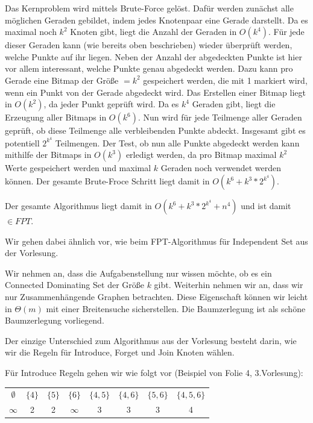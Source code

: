 Das Kernproblem wird mittels Brute-Force gelöst. Dafür werden zunächst alle möglichen Geraden gebildet, indem jedes Knotenpaar eine Gerade darstellt. Da es maximal noch $k^2$ Knoten gibt, liegt die Anzahl der Geraden in $O(k^4)$. Für jede dieser Geraden kann (wie bereits oben beschrieben) wieder überprüft werden, welche Punkte auf ihr liegen. Neben der Anzahl der abgedeckten Punkte ist hier vor allem interessant, welche Punkte genau abgedeckt werden. Dazu kann pro Gerade eine Bitmap der Größe $=k^2$ gespeichert werden, die mit 1 markiert wird, wenn ein Punkt von der Gerade abgedeckt wird. Das Erstellen einer Bitmap liegt in $O(k^2)$, da jeder Punkt geprüft wird. Da es $k^4$ Geraden gibt, liegt die Erzeugung aller Bitmaps in $O(k^6)$. Nun wird für jede Teilmenge aller Geraden geprüft, ob diese Teilmenge alle verbleibenden Punkte abdeckt. Insgesamt gibt es potentiell $2^{k^4}$ Teilmengen. Der Test, ob nun alle Punkte abgedeckt werden kann mithilfe der Bitmaps in $O(k^3)$ erledigt werden, da pro Bitmap maximal $k^2$ Werte gespeichert werden und maximal $k$ Geraden noch verwendet werden können. Der gesamte Brute-Froce Schritt liegt damit in $O(k^6+k^3*2^{k^4})$.

Der gesamte Algorithmus liegt damit in $O(k^6+k^3*2^{k^4}+n^4)$ und ist damit $\in FPT$.


Wir gehen dabei ähnlich vor, wie beim FPT-Algorithmus für Independent Set aus der Vorlesung.

Wir nehmen an, dass die Aufgabenstellung nur wissen möchte, ob es ein Connected Dominating Set der Größe $k$ gibt. Weiterhin nehmen wir an, dass wir nur Zusammenhängende Graphen betrachten.
Diese Eigenschaft können wir leicht in $\Theta(m)$ mit einer Breitensuche sicherstellen.
Die Baumzerlegung ist als schöne Baumzerlegung vorliegend.

Der einzige Unterschied zum Algorithmus aus der Vorlesung besteht darin, wie wir die Regeln für Introduce, Forget und Join Knoten wählen.

Für Introduce Regeln gehen wir wie folgt vor (Beispiel von Folie 4, 3.Vorlesung):

\begin{center}
\begin{tabular}{c c c c c c c c}
    $\emptyset$ & $\{4\}$ & $\{5\}$ & $\{6\}$ & $\{4,5\}$ &$\{4,6\}$ &$\{5,6\}$ &$\{4,5,6\}$\\
    $\infty$ & 2 & 2 & $\infty$ & 3 & 3 & 3 & 4\\
\end{tabular}
\end{center}

